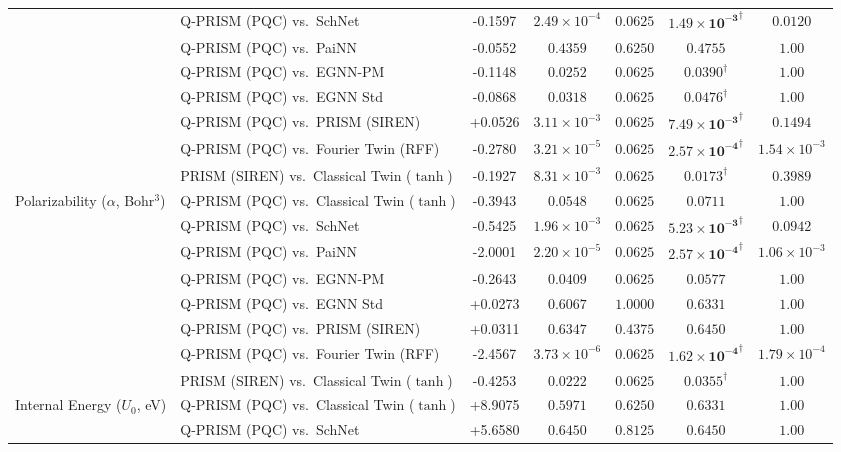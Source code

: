 \begin{table}[p]
{\begin{tabular}{llccccc}
 & Q-PRISM (PQC) vs.\ SchNet & -0.1597 & $2.49 \times 10^{-4}$ & $0.0625$ & $\mathbf{1.49 \times 10^{-3}}^{\dagger}$ & $0.0120$ \\
 & Q-PRISM (PQC) vs.\ PaiNN & -0.0552 & $0.4359$ & $0.6250$ & $0.4755$ & $1.00$ \\
 & Q-PRISM (PQC) vs.\ EGNN-PM & -0.1148 & $0.0252$ & $0.0625$ & $\mathbf{0.0390}^{\dagger}$ & $1.00$ \\
 & Q-PRISM (PQC) vs.\ EGNN Std & -0.0868 & $0.0318$ & $0.0625$ & $\mathbf{0.0476}^{\dagger}$ & $1.00$ \\
 & Q-PRISM (PQC) vs.\ PRISM (SIREN) & +0.0526 & $3.11 \times 10^{-3}$ & $0.0625$ & $\mathbf{7.49 \times 10^{-3}}^{\dagger}$ & $0.1494$ \\
 & Q-PRISM (PQC) vs.\ Fourier Twin (RFF) & -0.2780 & $3.21 \times 10^{-5}$ & $0.0625$ & $\mathbf{2.57 \times 10^{-4}}^{\dagger}$ & $1.54 \times 10^{-3}$ \\
 & PRISM (SIREN) vs.\ Classical Twin ($\tanh$) & -0.1927 & $8.31 \times 10^{-3}$ & $0.0625$ & $\mathbf{0.0173}^{\dagger}$ & $0.3989$ \\
\midrule
Polarizability ($\alpha$, Bohr$^3$) & Q-PRISM (PQC) vs.\ Classical Twin ($\tanh$) & -0.3943 & $0.0548$ & $0.0625$ & $0.0711$ & $1.00$ \\
 & Q-PRISM (PQC) vs.\ SchNet & -0.5425 & $1.96 \times 10^{-3}$ & $0.0625$ & $\mathbf{5.23 \times 10^{-3}}^{\dagger}$ & $0.0942$ \\
 & Q-PRISM (PQC) vs.\ PaiNN & -2.0001 & $2.20 \times 10^{-5}$ & $0.0625$ & $\mathbf{2.57 \times 10^{-4}}^{\dagger}$ & $1.06 \times 10^{-3}$ \\
 & Q-PRISM (PQC) vs.\ EGNN-PM & -0.2643 & $0.0409$ & $0.0625$ & $0.0577$ & $1.00$ \\
 & Q-PRISM (PQC) vs.\ EGNN Std & +0.0273 & $0.6067$ & $1.0000$ & $0.6331$ & $1.00$ \\
 & Q-PRISM (PQC) vs.\ PRISM (SIREN) & +0.0311 & $0.6347$ & $0.4375$ & $0.6450$ & $1.00$ \\
 & Q-PRISM (PQC) vs.\ Fourier Twin (RFF) & -2.4567 & $3.73 \times 10^{-6}$ & $0.0625$ & $\mathbf{1.62 \times 10^{-4}}^{\dagger}$ & $1.79 \times 10^{-4}$ \\
 & PRISM (SIREN) vs.\ Classical Twin ($\tanh$) & -0.4253 & $0.0222$ & $0.0625$ & $\mathbf{0.0355}^{\dagger}$ & $1.00$ \\
\midrule
Internal Energy ($U_0$, eV) & Q-PRISM (PQC) vs.\ Classical Twin ($\tanh$) & +8.9075 & $0.5971$ & $0.6250$ & $0.6331$ & $1.00$ \\
 & Q-PRISM (PQC) vs.\ SchNet & +5.6580 & $0.6450$ & $0.8125$ & $0.6450$ & $1.00$ \\

\end{tabular}}
\end{table}
